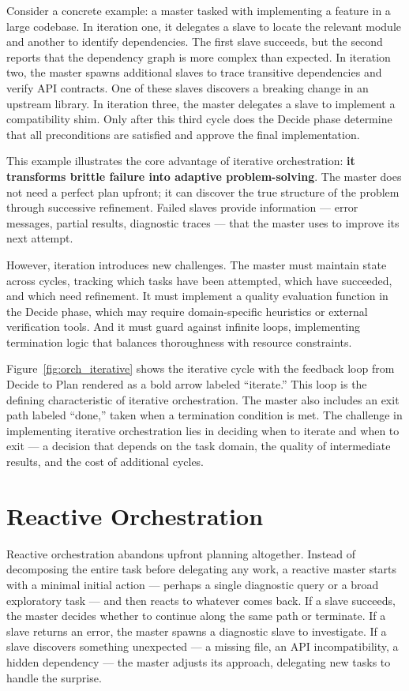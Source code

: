 Consider a concrete example: a master tasked with implementing a feature in a large codebase. In iteration one, it delegates a slave to locate the relevant module and another to identify dependencies. The first slave succeeds, but the second reports that the dependency graph is more complex than expected. In iteration two, the master spawns additional slaves to trace transitive dependencies and verify API contracts. One of these slaves discovers a breaking change in an upstream library. In iteration three, the master delegates a slave to implement a compatibility shim. Only after this third cycle does the Decide phase determine that all preconditions are satisfied and approve the final implementation.

This example illustrates the core advantage of iterative orchestration: \textbf{it transforms brittle failure into adaptive problem-solving}. The master does not need a perfect plan upfront; it can discover the true structure of the problem through successive refinement. Failed slaves provide information — error messages, partial results, diagnostic traces — that the master uses to improve its next attempt.

However, iteration introduces new challenges. The master must maintain state across cycles, tracking which tasks have been attempted, which have succeeded, and which need refinement. It must implement a quality evaluation function in the Decide phase, which may require domain-specific heuristics or external verification tools. And it must guard against infinite loops, implementing termination logic that balances thoroughness with resource constraints.

Figure~\ref{fig:orch_iterative} shows the iterative cycle with the feedback loop from Decide to Plan rendered as a bold arrow labeled ``iterate.'' This loop is the defining characteristic of iterative orchestration. The master also includes an exit path labeled ``done,'' taken when a termination condition is met. The challenge in implementing iterative orchestration lies in deciding when to iterate and when to exit — a decision that depends on the task domain, the quality of intermediate results, and the cost of additional cycles.

\section{Reactive Orchestration}\label{sec:reactive}

Reactive orchestration abandons upfront planning altogether. Instead of decomposing the entire task before delegating any work, a reactive master starts with a minimal initial action — perhaps a single diagnostic query or a broad exploratory task — and then reacts to whatever comes back. If a slave succeeds, the master decides whether to continue along the same path or terminate. If a slave returns an error, the master spawns a diagnostic slave to investigate. If a slave discovers something unexpected — a missing file, an API incompatibility, a hidden dependency — the master adjusts its approach, delegating new tasks to handle the surprise.

